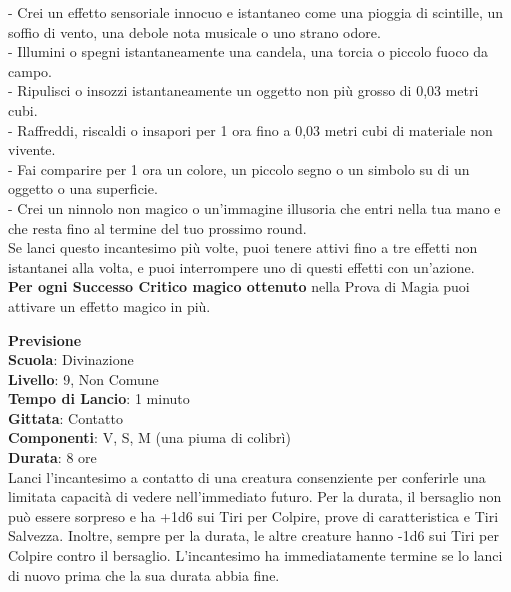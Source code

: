 \begin{multicols}{2}
- Crei un effetto sensoriale innocuo e istantaneo come una pioggia di scintille, un soffio di vento, una debole nota musicale o uno strano odore.\\
- Illumini o spegni istantaneamente una candela, una torcia o piccolo fuoco da campo.\\
- Ripulisci o insozzi istantaneamente un oggetto non più grosso di 0,03 metri cubi.\\
- Raffreddi, riscaldi o insapori per 1 ora fino a 0,03 metri cubi di materiale non vivente.\\
- Fai comparire per 1 ora un colore, un piccolo segno o un simbolo su di un oggetto o una superficie.\\
- Crei un ninnolo non magico o un'immagine illusoria che entri nella tua mano e che resta fino al termine del tuo prossimo round.\\

Se lanci questo incantesimo più volte, puoi tenere attivi fino a tre effetti non istantanei alla volta, e puoi interrompere uno di questi effetti con un'azione.\\
\textbf{Per ogni Successo Critico magico ottenuto} nella Prova di Magia puoi attivare un effetto magico in più.


\medskip\textbf{Previsione}\\
\textbf{Scuola}: Divinazione\\
\textbf{Livello}: 9, Non Comune\\
\textbf{Tempo di Lancio}: 1 minuto\\
\textbf{Gittata}: Contatto\\
\textbf{Componenti}: V, S, M (una piuma di colibrì)\\
\textbf{Durata}: 8 ore\\
Lanci l'incantesimo a contatto di una creatura consenziente per conferirle una limitata capacità di vedere nell'immediato futuro. Per la durata, il bersaglio non può essere sorpreso e ha +1d6 sui Tiri per Colpire, prove di caratteristica e Tiri Salvezza. Inoltre, sempre per la durata, le altre creature hanno -1d6 sui Tiri per Colpire contro il bersaglio. L'incantesimo ha immediatamente termine se lo lanci di nuovo prima che la sua durata abbia fine.


\end{multicols}
